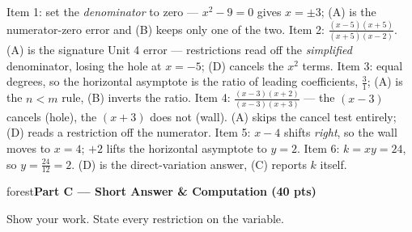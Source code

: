 \documentclass[10pt]{article}
\newcommand{\parthead}[1]{%
  \vspace{6pt}\noindent
  \begin{headlinebox}{forest}\color{white}\bfseries #1\end{headlinebox}%
  \vspace{4pt}}
\begin{document}
\begin{teachernote}
Item 1: set the \emph{denominator} to zero --- $x^2-9=0$ gives $x=\pm3$; (A) is the numerator-zero
error and (B) keeps only one of the two. Item 2: $\frac{(x-5)(x+5)}{(x+5)(x-2)}$. (A) is the
signature Unit 4 error --- restrictions read off the \emph{simplified} denominator, losing the hole
at $x=-5$; (D) cancels the $x^2$ terms. Item 3: equal degrees, so the horizontal asymptote is the
ratio of leading coefficients, $\frac31$; (A) is the $n<m$ rule, (B) inverts the ratio. Item 4:
$\frac{(x-3)(x+2)}{(x-3)(x+3)}$ --- the $(x-3)$ cancels (hole), the $(x+3)$ does not (wall). (A)
skips the cancel test entirely; (D) reads a restriction off the numerator. Item 5: $x-4$ shifts
\emph{right}, so the wall moves to $x=4$; $+2$ lifts the horizontal asymptote to $y=2$. Item 6:
$k=xy=24$, so $y=\frac{24}{12}=2$. (D) is the direct-variation answer, (C) reports $k$ itself.
\end{teachernote}

\parthead{Part C --- Short Answer \& Computation (40 pts)}
Show your work. State every restriction on the variable.
\end{document}
